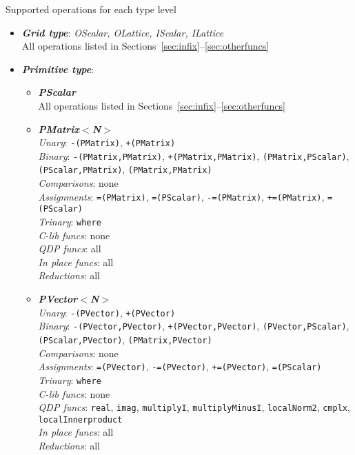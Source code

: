 \documentclass[12pt,letterpaper]{article}
\begin{document}
Supported operations for each type level
\begin{itemize}
\item
{\bf\em Grid type}: {\em OScalar, OLattice, IScalar, ILattice}\\
All operations listed in Sections~\ref{sec:infix}--\ref{sec:otherfuncs}

\item
{\bf\em Primitive type}:
\begin{itemize}
\item
{\bf\em PScalar}\\
All operations listed in Sections~\ref{sec:infix}--\ref{sec:otherfuncs}

\item
{\bf\em PMatrix$<$N$>$}\\
  {\em Unary}: {\tt -(PMatrix)}, {\tt +(PMatrix)}\\
  {\em Binary}: {\tt -(PMatrix,PMatrix)}, {\tt +(PMatrix,PMatrix)}, 
       {\tt *(PMatrix,PScalar)}, {\tt *(PScalar,PMatrix)}, {\tt *(PMatrix,PMatrix)}\\
  {\em Comparisons}: none\\
  {\em Assignments}: {\tt =(PMatrix)}, {\tt =(PScalar)}, {\tt -=(PMatrix)}, 
       {\tt +=(PMatrix)}, {\tt *=(PScalar)}\\
  {\em Trinary}: {\tt where}\\
  {\em C-lib funcs}: none\\
  {\em QDP funcs}: all\\
  {\em In place funcs}: all\\
  {\em Reductions}: all\\

\item
{\bf\em PVector$<$N$>$}\\
  {\em Unary}: {\tt -(PVector)}, {\tt +(PVector)}\\
  {\em Binary}: {\tt -(PVector,PVector)}, {\tt +(PVector,PVector)}, 
       {\tt *(PVector,PScalar)}, {\tt *(PScalar,PVector)}, {\tt *(PMatrix,PVector)}\\
  {\em Comparisons}: none\\
  {\em Assignments}: {\tt =(PVector)}, {\tt -=(PVector)}, {\tt +=(PVector)}, 
       {\tt *=(PScalar)}\\
  {\em Trinary}: {\tt where}\\
  {\em C-lib funcs}: none\\
  {\em QDP funcs}: {\tt real}, {\tt imag}, {\tt multiplyI}, {\tt multiplyMinusI}, 
        {\tt localNorm2}, {\tt cmplx}, {\tt localInnerproduct}\\
  {\em In place funcs}: all\\
  {\em Reductions}: all\\


\end{itemize}
\end{itemize}
\end{document}
